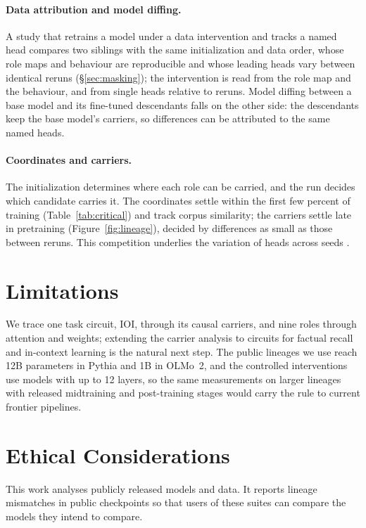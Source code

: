 \documentclass[11pt]{article}
\begin{document}
\paragraph{Data attribution and model diffing.}
A study that retrains a model under a data intervention and tracks a named head compares two siblings with the same initialization and data order, whose role maps and behaviour are reproducible and whose leading heads vary between identical reruns (\S\ref{sec:masking}); the intervention is read from the role map and the behaviour, and from single heads relative to reruns.
Model diffing between a base model and its fine-tuned descendants falls on the other side: the descendants keep the base model's carriers, so differences can be attributed to the same named heads.

\paragraph{Coordinates and carriers.}
The initialization determines where each role can be carried, and the run decides which candidate carries it.
The coordinates settle within the first few percent of training (Table~\ref{tab:critical}) and track corpus similarity; the carriers settle late in pretraining (Figure~\ref{fig:lineage}), decided by differences as small as those between reruns.
This competition underlies the variation of heads across seeds \citep{tigges2024llm,bali2026quantifying}.

\section*{Limitations}
We trace one task circuit, IOI, through its causal carriers, and nine roles through attention and weights; extending the carrier analysis to circuits for factual recall and in-context learning is the natural next step.
The public lineages we use reach 12B parameters in Pythia and 1B in OLMo~2, and the controlled interventions use models with up to 12 layers, so the same measurements on larger lineages with released midtraining and post-training stages would carry the rule to current frontier pipelines.

\section*{Ethical Considerations}
This work analyses publicly released models and data. It reports lineage mismatches in public checkpoints so that users of these suites can compare the models they intend to compare.
\end{document}
